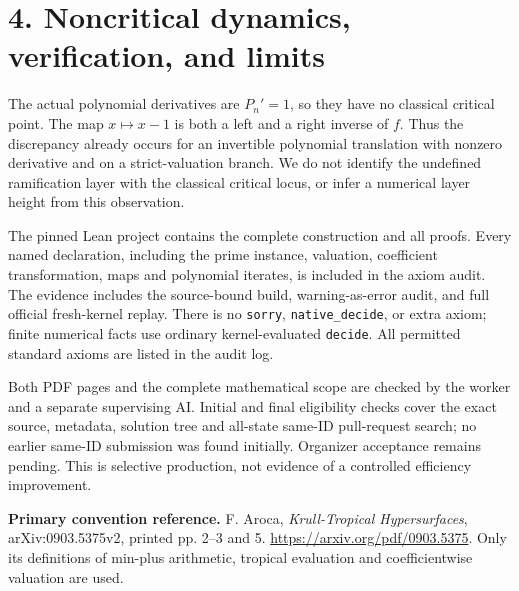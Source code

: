 \documentclass[10pt]{article}
\begin{document}
\section*{4. Noncritical dynamics, verification, and limits}
The actual polynomial derivatives are $P_n'=1$, so they have no classical critical point. The map $x\mapsto x-1$ is both a left and a right inverse of $f$. Thus the discrepancy already occurs for an invertible polynomial translation with nonzero derivative and on a strict-valuation branch. We do not identify the undefined ramification layer with the classical critical locus, or infer a numerical layer height from this observation.

The pinned Lean project contains the complete construction and all proofs. Every named declaration, including the prime instance, valuation, coefficient transformation, maps and polynomial iterates, is included in the axiom audit. The evidence includes the source-bound build, warning-as-error audit, and full official fresh-kernel replay. There is no \texttt{sorry}, \texttt{native\_decide}, or extra axiom; finite numerical facts use ordinary kernel-evaluated \texttt{decide}. All permitted standard axioms are listed in the audit log.

Both PDF pages and the complete mathematical scope are checked by the worker and a separate supervising AI. Initial and final eligibility checks cover the exact source, metadata, solution tree and all-state same-ID pull-request search; no earlier same-ID submission was found initially. Organizer acceptance remains pending. This is selective production, not evidence of a controlled efficiency improvement.

\textbf{Primary convention reference.} F. Aroca, \emph{Krull-Tropical Hypersurfaces}, arXiv:0903.5375v2, printed pp. 2--3 and 5. \url{https://arxiv.org/pdf/0903.5375}. Only its definitions of min-plus arithmetic, tropical evaluation and coefficientwise valuation are used.
\end{document}
